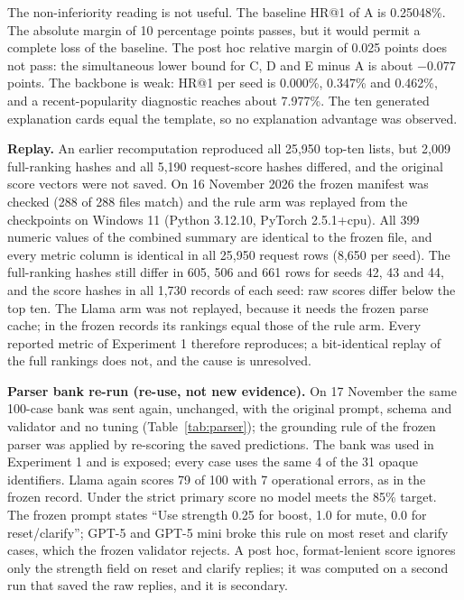 \documentclass[conference]{IEEEtran}
\begin{document}
The non-inferiority reading is not useful. The baseline HR@1 of A is 0.25048\%. The absolute margin of 10 percentage points passes, but it would permit a complete loss of the baseline. The post hoc relative margin of 0.025 points does not pass: the simultaneous lower bound for C, D and E minus A is about $-0.077$ points. The backbone is weak: HR@1 per seed is 0.000\%, 0.347\% and 0.462\%, and a recent-popularity diagnostic reaches about 7.977\%. The ten generated explanation cards equal the template, so no explanation advantage was observed.

\textbf{Replay.} An earlier recomputation reproduced all 25,950 top-ten lists, but 2,009 full-ranking hashes and all 5,190 request-score hashes differed, and the original score vectors were not saved. On 16 November 2026 the frozen manifest was checked (288 of 288 files match) and the rule arm was replayed from the checkpoints on Windows 11 (Python 3.12.10, PyTorch 2.5.1+cpu). All 399 numeric values of the combined summary are identical to the frozen file, and every metric column is identical in all 25,950 request rows (8,650 per seed). The full-ranking hashes still differ in 605, 506 and 661 rows for seeds 42, 43 and 44, and the score hashes in all 1,730 records of each seed: raw scores differ below the top ten. The Llama arm was not replayed, because it needs the frozen parse cache; in the frozen records its rankings equal those of the rule arm. Every reported metric of Experiment 1 therefore reproduces; a bit-identical replay of the full rankings does not, and the cause is unresolved.

\textbf{Parser bank re-run (re-use, not new evidence).} On 17 November the same 100-case bank was sent again, unchanged, with the original prompt, schema and validator and no tuning (Table~\ref{tab:parser}); the grounding rule of the frozen parser was applied by re-scoring the saved predictions. The bank was used in Experiment 1 and is exposed; every case uses the same 4 of the 31 opaque identifiers. Llama again scores 79 of 100 with 7 operational errors, as in the frozen record. Under the strict primary score no model meets the 85\% target. The frozen prompt states ``Use strength 0.25 for boost, 1.0 for mute, 0.0 for reset/clarify''; GPT-5 and GPT-5 mini broke this rule on most reset and clarify cases, which the frozen validator rejects. A post hoc, format-lenient score ignores only the strength field on reset and clarify replies; it was computed on a second run that saved the raw replies, and it is secondary.
\end{document}
